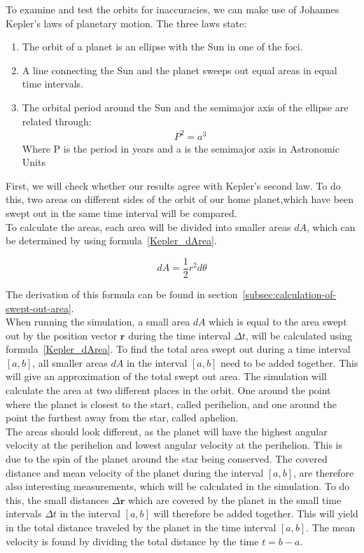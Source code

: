 \documentclass[reprint,english,notitlepage]{revtex4-2}
\begin{document}
To examine and test the orbits for inaccuracies, we can make use of Johannes Kepler's laws of planetary motion.
The three laws state:
\begin{enumerate}
    \item The orbit of a planet is an ellipse with the
		Sun in one of the foci.
	\item A line connecting the Sun and the planet
		sweeps out equal areas in equal time intervals.
	\item The orbital period around the Sun and the
		semimajor axis of the ellipse are related through:
		\begin{align*}
		    P^2 = a^3
		\end{align*}
		Where P is the period in years and a is the semimajor axis in Astronomic Units%
\end{enumerate}

First, we will check whether our results agree with Kepler's second law.
To do this, two areas on different sides of the orbit of our home planet,which have been swept out in the same time interval will be compared.\\
To calculate the areas, each area will be divided into smaller areas $dA$, which can be determined by using formula~\eqref{Kepler_dArea}.

\begin{equation} \label{Kepler_dArea}
    dA = \frac{1}{2}r^2 d\theta 
\end{equation}

The derivation of this formula can be found in section~\ref{subsec:calculation-of-swept-out-area}.\\

When running the simulation, a small area $dA$ which is equal to the area swept out by the position vector $\textbf{r}$ during the time interval $\Delta t$, will be calculated using formula~\eqref{Kepler_dArea}.
To find the total area swept out during a time interval $[a, b]$, all smaller areas $dA$ in the interval $[a, b]$ need to be added together.
This will give an approximation of the total swept out area.
The simulation will calculate the area at two different places in the orbit.
One around the point where the planet is closest to the start, called perihelion, and one around the point the furthest away from the star, called aphelion.\\
The areas should look different, as the planet will have the highest angular velocity at the perihelion and lowest angular velocity at the perihelion.
This is due to the spin of the planet around the star being conserved.
The covered distance and mean velocity of the planet during the interval $[a, b]$, are therefore also interesting measurements, which will be calculated in the simulation.
To do this, the small distances $\Delta \textbf{r}$ which are covered by the planet in the small time intervals $\Delta t$ in the interval $[a, b]$ will therefore be added together.
This will yield in the total distance traveled by the planet in the time interval $[a, b]$.
The mean velocity is found by dividing the total distance by the time $t = b-a$.\newline
\end{document}
